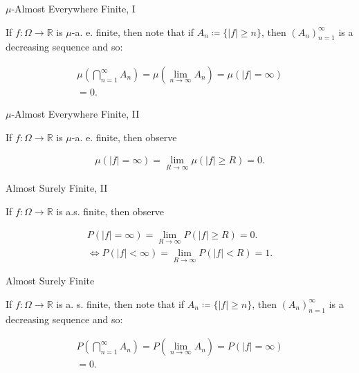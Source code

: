 \begin{observation}{}{$\mu$-Almost Everywhere Finite, I}

    If $f: \Omega \to \mathbb{R}$ is $\mu$-a. e. finite, then note that if $A_n \coloneqq \{ |f| \geq n \}$, then $(A_n)_{n=1}^{\infty}$ is a decreasing sequence and so:

        \begin{align*}
            \mu\left(\bigcap_{n=1}^{\infty} A_n\right) = \mu\left(\lim_{n \to \infty} A_n\right) = \mu(|f| = \infty) \\ = 0.
        \end{align*}

\end{observation}

\begin{observation}{}{$\mu$-Almost Everywhere Finite, II}

    If $f: \Omega \to \mathbb{R}$ is $\mu$-a. e. finite, then observe

        \begin{align*}
            \mu(|f| = \infty) = \lim_{R \to \infty} \mu(|f| \geq R) = 0.
        \end{align*}

\end{observation}

\begin{observation}{}{Almost Surely Finite, II}

    If $f: \Omega \to \mathbb{R}$ is a.s. finite, then observe

        \begin{align*}
            P(|f| = \infty) = \lim_{R \to \infty} P(|f| \geq R) = 0. \\
            \iff P(|f| < \infty) = \lim_{R \to \infty} P(|f| < R) = 1.
        \end{align*}

\end{observation}

\begin{observation}{}{Almost Surely Finite}

    If $f: \Omega \to \mathbb{R}$ is a. s. finite, then note that if $A_n \coloneqq \{ |f| \geq n \}$, then $(A_n)_{n=1}^{\infty}$ is a decreasing sequence and so:

        \begin{align*}
            P\left(\bigcap_{n=1}^{\infty} A_n\right) = P\left(\lim_{n \to \infty} A_n\right) = P(|f| = \infty) \\ = 0.
        \end{align*}

\end{observation}

